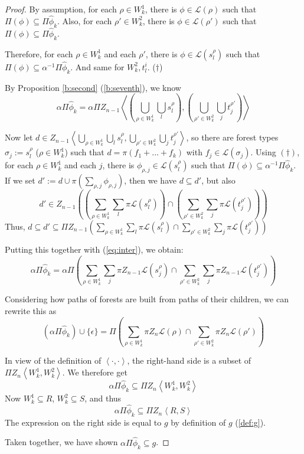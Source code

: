 \documentclass[sigplan,9pt]{acmart}\settopmatter{printfolios=true,printccs=false,printacmref=false}
\theoremstyle{definition}
\newcommand{\La}[0]{{\mathcal{L}}}
\newcommand{\Rn}[0]{Z_n}
\newcommand{\Rnm}[0]{Z_{n-1}}
\begin{document}
\begin{proof}

By assumption, for each $\rho \in W^1_k$, there is $\phi \in \La(\rho)$ such that $\Pi(\phi) \subseteq \Pi\widehat{\phi}_k$.
Also, for each $\rho' \in W^2_k$, there is $\phi \in \La(\rho')$ such that $\Pi(\phi) \subseteq \Pi\widehat{\phi}_k$.


Therefore, for each $\rho \in W^1_k$ and each $\rho'$, there is $\phi \in \La(s^\rho_l)$ such that $\Pi(\phi) \subseteq \alpha^{-1}\Pi\widehat{\phi}_k$.
And same for $W^2_k, t^i_l$. ($\dagger$)

By Proposition \ref{b:second} (\ref{b:seventh}), we know
\begin{equation}\label{eq:inter}
\alpha \Pi\widehat{\phi}_k = \alpha \Pi \Rnm \left\langle \left(\bigcup_{\rho \in W^1_k} \bigcup_l s^\rho_l \right),\left( \bigcup_{\rho' \in W^2_k} \bigcup_j t^{\rho'}_j\right)\right\rangle
\end{equation}

Now let $d \in \Rnm \left\langle \bigcup_{\rho \in W^1_k} \bigcup_l s^\rho_l , \bigcup_{\rho' \in W^2_k} \bigcup_j t^{\rho'}_j\right\rangle$,
so there are forest types $\sigma_j := s^{\rho}_l$ ($\rho \in W^1_k$) such that
$d = \pi(f_1 + ... + f_k)$
with $f_j \in \La(\sigma_j)$.
Using $(\dagger)$, for each $\rho \in W^1_k$ and each $j$, there is $\phi_{\rho,j} \in \La(s^\rho_l)$ such that $\Pi(\phi) \subseteq \alpha^{-1}\Pi\widehat{\phi}_k$.
If we set $d' := d \cup \pi(\sum_{\rho,j} \phi_{\rho,j})$, then we have $d \subseteq d'$, but also
$$d' \in\Rnm \left(\left( \sum_{\rho \in W^1_k} \sum_l\pi \La\left(s^\rho_l\right)\right) \cap  \left(\sum_{\rho' \in W^2_k} \sum_j\pi \La\left(t^{\rho'}_j\right)\right)\right)$$
Thus, $d \subseteq d' \subseteq \Pi\Rnm \left( \sum_{\rho \in W^1_k} \sum_l\pi \La\left(s^\rho_l\right) \cap  \sum_{\rho' \in W^2_k} \sum_j\pi \La\left(t^{\rho'}_j\right)\right)$



Putting this together with (\ref{eq:inter}), we obtain:
$$\alpha \Pi\widehat{\phi}_k = \alpha \Pi \left( \sum_{\rho \in W^1_k} \sum_j\pi\Rnm \La\left(s^\rho_j\right) \cap  \sum_{\rho' \in W^2_k} \sum_j\pi\Rnm \La\left(t^{\rho'}_j\right)\right)$$


Considering how paths of forests are built from paths of their children, we can rewrite this as
$$\left(\alpha \Pi\widehat{\phi}_k\right) \cup \{\epsilon\} =\Pi  \left(\sum_{\rho \in W^1_k} \pi\Rn\La(\rho) \cap \sum_{\rho' \in W^2_k} \pi\Rn\La(\rho')\right)$$

In view of the definition of $\left\langle \cdot,\cdot\right\rangle$, the right-hand side is a subset of $\Pi\Rn\left\langle W^1_k, W^2_k\right\rangle$. 
We therefore get
$$\alpha \Pi\widehat{\phi}_k \subseteq \Pi \Rn \left\langle W^1_k, W^2_k\right\rangle$$
Now $W^1_k \subseteq R$, $W^2_k \subseteq S$, and thus
$$\alpha \Pi\widehat{\phi}_k \subseteq \Pi \Rn \left\langle R, S\right\rangle$$
The expression on the right side is equal to $g$ by definition of $g$ (\ref{def:g}).

Taken together, we have shown $\alpha\Pi\widehat{\phi}_k \subseteq g$.
\end{proof}
\end{document}
